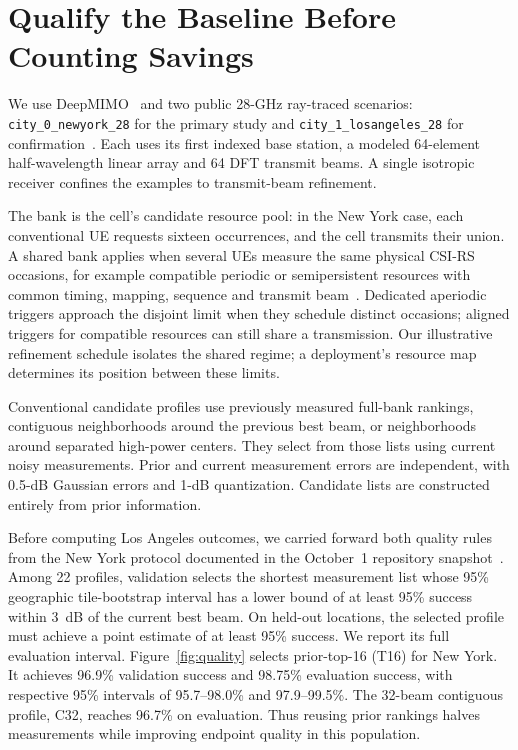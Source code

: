 \documentclass[journal,10pt]{IEEEtran}
\begin{document}
\section{Qualify the Baseline Before Counting Savings}
We use DeepMIMO~\cite{deepmimo2019} and two public 28-GHz ray-traced scenarios: \texttt{city\_0\_newyork\_28} for the primary study and \texttt{city\_1\_losangeles\_28} for confirmation~\cite{citydata}. Each uses its first indexed base station, a modeled 64-element half-wavelength linear array and 64 DFT transmit beams. A single isotropic receiver confines the examples to transmit-beam refinement.

The bank is the cell's candidate resource pool: in the New York case, each conventional UE requests sixteen occurrences, and the cell transmits their union. A shared bank applies when several UEs measure the same physical CSI-RS occasions, for example compatible periodic or semipersistent resources with common timing, mapping, sequence and transmit beam~\cite{ts38214,ts38331}. Dedicated aperiodic triggers approach the disjoint limit when they schedule distinct occasions; aligned triggers for compatible resources can still share a transmission. Our illustrative refinement schedule isolates the shared regime; a deployment's resource map determines its position between these limits.

Conventional candidate profiles use previously measured full-bank rankings, contiguous neighborhoods around the previous best beam, or neighborhoods around separated high-power centers. They select from those lists using current noisy measurements. Prior and current measurement errors are independent, with 0.5-dB Gaussian errors and 1-dB quantization. Candidate lists are constructed entirely from prior information.

Before computing Los Angeles outcomes, we carried forward both quality rules from the New York protocol documented in the October~1 repository snapshot~\cite{projectrepo}. Among 22 profiles, validation selects the shortest measurement list whose 95\% geographic tile-bootstrap interval has a lower bound of at least 95\% success within 3~dB of the current best beam. On held-out locations, the selected profile must achieve a point estimate of at least 95\% success. We report its full evaluation interval. Figure~\ref{fig:quality} selects prior-top-16 (T16) for New York. It achieves 96.9\% validation success and 98.75\% evaluation success, with respective 95\% intervals of 95.7--98.0\% and 97.9--99.5\%. The 32-beam contiguous profile, C32, reaches 96.7\% on evaluation. Thus reusing prior rankings halves measurements while improving endpoint quality in this population.
\end{document}
